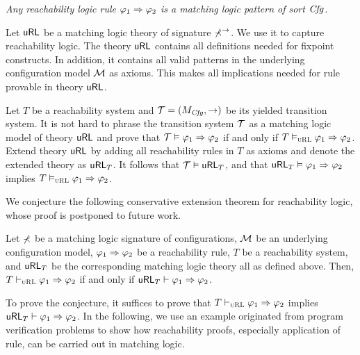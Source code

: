 \documentclass{amsart}
\begin{document}
\begin{center}
	\em
	Any reachability logic rule $\varphi_1 \Rightarrow \varphi_2$
	is a matching logic pattern of sort $\mathit{Cfg}$.
\end{center}

Let $\mathsf{uRL}$ be a matching logic theory of signature $\mathbb{\Sigma}^\to$.
We use it to capture  reachability logic.
The theory $\mathsf{uRL}$ contains all definitions needed for fixpoint constructs.
In addition, it contains all valid patterns 
in the underlying configuration model $\mathcal{M}$ as axioms.
This makes all implications needed for  rule
provable in theory $\mathsf{uRL}$.

Let $T$ be a reachability system 
and $\mathcal{T} = (M_{\mathit{Cfg}}, \to)$ be its yielded transition system.
It is not hard to phrase the transition system $\mathcal{T}$ as a matching logic model
of theory $\mathsf{uRL}$ and prove that
$\mathcal{T} \vDash \varphi_1 \Rightarrow \varphi_2$
if and only if
$T \vDash_{\textsc{uRL}} \varphi_1 \Rightarrow \varphi_2$.
Extend theory $\mathsf{uRL}$ by adding all reachability rules in $T$ as axioms
and denote the extended theory as $\mathsf{uRL}_T$.
It follows that $\mathcal{T} \vDash \mathsf{uRL}_T$, and that
$\mathsf{uRL}_T \vDash \varphi_1 \Rightarrow \varphi_2$ implies
$T \vDash_{\textsc{uRL}} \varphi_1 \Rightarrow \varphi_2$.

We conjecture the following conservative extension theorem for
reachability logic, whose proof is postponed to future work.
\begin{conjecture}
	Let $\mathbb{\Sigma}$ be a matching logic signature of configurations,
	$\mathcal{M}$ be an underlying configuration model,
	$\varphi_1 \Rightarrow \varphi_2$ be a reachability rule,
	$T$ be a reachability system,
	and $\mathsf{uRL}_T$ be the corresponding matching logic theory all as defined above.
	Then, $T \vdash_{\textsc{uRL}} \varphi_1 \Rightarrow \varphi_2$ if and only if
	$\mathsf{uRL}_T \vdash \varphi_1 \Rightarrow \varphi_2$.
\end{conjecture}

To prove the conjecture, it suffices to prove that
$T \vdash_{\textsc{uRL}} \varphi_1 \Rightarrow \varphi_2$ implies
$\mathsf{uRL}_T \vdash \varphi_1 \Rightarrow \varphi_2$.
In the following, we use an example originated from
program verification problems to show how reachability proofs,
especially application of  rule,
can be carried out in matching logic.

\end{document}
